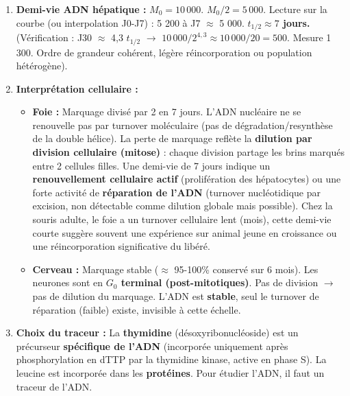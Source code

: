 \documentclass[11pt]{article}
\begin{document}
\begin{exoresolu}
\begin{enumerate}
    \item \textbf{Demi-vie ADN hépatique :} $M_0 = 10\,000$. $M_0/2 = 5\,000$.
    Lecture sur la courbe (ou interpolation J0-J7) : 5 200 à J7 $\approx$ 5 000.
    \textbf{$t_{1/2} \approx 7$ jours.}
    (Vérification : J30 $\approx$ 4,3 $t_{1/2}$ $\rightarrow$ $10\,000 / 2^{4,3} \approx 10\,000 / 20 = 500$. Mesure 1 300. Ordre de grandeur cohérent, légère réincorporation ou population hétérogène).

    \item \textbf{Interprétation cellulaire :}
    \begin{itemize}
        \item \textbf{Foie :} Marquage divisé par 2 en 7 jours. L'ADN nucléaire ne se renouvelle pas par turnover moléculaire (pas de dégradation/resynthèse de la double hélice). La perte de marquage reflète la \textbf{dilution par division cellulaire (mitose)} : chaque division partage les brins marqués entre 2 cellules filles. Une demi-vie de 7 jours indique un \textbf{renouvellement cellulaire actif} (prolifération des hépatocytes) ou une forte activité de \textbf{réparation de l'ADN} (turnover nucléotidique par excision, non détectable comme dilution globale mais possible). Chez la souris adulte, le foie a un turnover cellulaire lent (mois), cette demi-vie courte suggère souvent une expérience sur animal jeune en croissance ou une réincorporation significative du  libéré.
        \item \textbf{Cerveau :} Marquage stable ($\approx$ 95-100\% conservé sur 6 mois). Les neurones sont en \textbf{$G_0$ terminal (post-mitotiques)}. Pas de division $\rightarrow$ pas de dilution du marquage. L'ADN est \textbf{stable}, seul le turnover de réparation (faible) existe, invisible à cette échelle.
    \end{itemize}

    \item \textbf{Choix du traceur :} La \textbf{thymidine} (désoxyribonucléoside) est un précurseur \textbf{spécifique de l'ADN} (incorporée uniquement après phosphorylation en dTTP par la thymidine kinase, active en phase S). La leucine est incorporée dans les \textbf{protéines}. Pour étudier l'ADN, il faut un traceur de l'ADN.
\end{enumerate}
\end{exoresolu}
\end{document}
